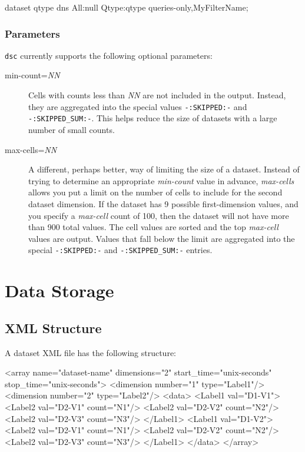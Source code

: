 \documentclass{report}
\begin{document}
\begin{MyVerbatim}
dataset qtype dns All:null Qtype:qtype queries-only,MyFilterName;
\end{MyVerbatim}

\subsection{Parameters}
\label{sec-dataset-params}

\noindent
{\tt dsc\/} currently supports the following optional parameters:

\begin{description}
\item[min-count={\em NN\/}]
	Cells with counts less than {\em NN\/} are not included in
	the output.  Instead, they are aggregated into the special
	values {\tt -:SKIPPED:-\/} and {\tt -:SKIPPED\_SUM:-\/}.
	This helps reduce the size of datasets with a large number
	of small counts.
\item[max-cells={\em NN\/}]
	A different, perhaps better, way of limiting the size
	of a dataset.  Instead of trying to determine an appropriate
	{\em min-count\/} value in advance, {\em max-cells\/}
	allows you put a limit on the number of cells to
	include for the second dataset dimension.  If the dataset
	has 9 possible first-dimension values, and you specify
	a {\em max-cell\/} count of 100, then the dataset will not
	have more than 900 total values.  The cell values are sorted
	and the top {\em max-cell\/} values are output.  Values
	that fall below the limit are aggregated into the special
	{\tt -:SKIPPED:-\/} and {\tt -:SKIPPED\_SUM:-\/} entries.
\end{description}

\chapter{Data Storage}

\section{XML Structure}

A dataset XML file has the following structure:

\begin{MyVerbatim}
<array name="dataset-name" dimensions="2" start_time="unix-seconds"
        stop_time="unix-seconds">
  <dimension number="1" type="Label1"/>
  <dimension number="2" type="Label2"/>
  <data>
    <Label1 val="D1-V1">
      <Label2 val="D2-V1" count="N1"/>
      <Label2 val="D2-V2" count="N2"/>
      <Label2 val="D2-V3" count="N3"/>
    </Label1>
    <Label1 val="D1-V2">
      <Label2 val="D2-V1" count="N1"/>
      <Label2 val="D2-V2" count="N2"/>
      <Label2 val="D2-V3" count="N3"/>
    </Label1>
  </data>
</array>
\end{MyVerbatim}
\end{document}
